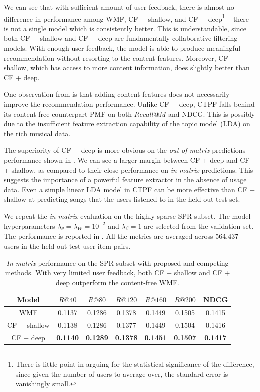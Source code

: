 We can see that with sufficient amount of user feedback, there is almost no difference in performance among \gls{WMF}, CF + shallow, and CF + deep\footnote{There is little point in arguing for the statistical significance of the difference, since given the number of users to average over, the standard error is vanishingly small.} -- there is not a single model which is consistently better. This is understandable, since both CF + shallow and CF + deep are fundamentally collaborative filtering models. With enough user feedback, the model is able to produce meaningful recommendation without resorting to the content features. Moreover, CF + shallow, which has access to more content information, does slightly better than CF + deep.

One observation from  is that adding content features does not necessarily improve the recommendation performance. Unlike CF + deep, \gls{CTPF} falls behind its content-free counterpart \gls{PMF} on both $Recall@M$ and NDCG. This is possibly due to the insufficient feature extraction capability of the topic model (\gls{LDA}) on the rich musical data. 

The superiority of CF + deep is more obvious on the \emph{out-of-matrix} predictions performance shown in . We can see a larger margin between CF + deep and CF + shallow, as compared to their close performance on \emph{in-matrix} predictions. This suggests the importance of a powerful feature extractor in the absence of usage data. Even a simple linear \gls{LDA} model in \gls{CTPF} can be more effective than CF + shallow at predicting songs that the users listened to in the held-out test set. %

 We repeat the \emph{in-matrix} evaluation on the highly sparse SPR subset. The model hyperparameters $\lambda_\theta = \lambda_W = 10^{-2}$ and $\lambda_\beta = 1$ are selected from the validation set. The performance is reported in . All the metrics are averaged across 564,437 users in the held-out test user-item pairs.

\begin{table}
\centering
  \begin{tabular}{ c  c  c  c  c c   c  }
    \toprule
    Model & $R@40$  & $R@80$  & $R@120$  & $R@160$ & $R@200$ & NDCG \\ \midrule
     \gls{WMF} \citep{hu2008collaborative} &  0.1137 &   0.1286 & 0.1378 &   0.1449 &  0.1505 & 0.1415\\
     CF + shallow & 0.1138 &  0.1286 &  0.1377 &  0.1449 &  0.1504 & 0.1416 \\
     CF + deep & \bf{0.1140} & \bf{0.1289} & \bf{0.1378} & \bf{0.1451} & \bf{0.1507} & \bf{0.1417} \\
    \bottomrule
  \end{tabular}
  \caption{\emph{In-matrix} performance on the SPR subset with proposed and competing methods. With very limited user feedback, both CF + shallow and CF + deep outperform the content-free \gls{WMF}. } 
  \label{tab:spr}
\end{table}

